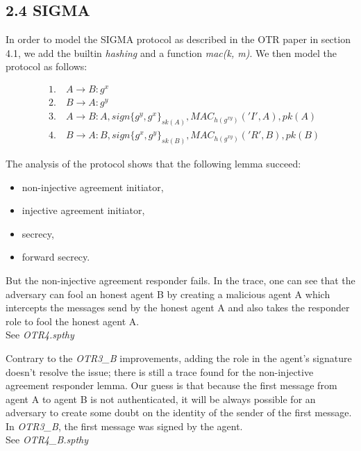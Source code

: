 \documentclass[
]{article}
\begin{document}
\newpage
\hypertarget{sigma}{%
\subsection{2.4 SIGMA}\label{sigma}}

In order to model the SIGMA protocol as described in the OTR paper in section 4.1, we add the builtin \emph{hashing} and a function \emph{mac(k, m)}. We then model the protocol as follows:

\begin{align*}
&\text{1.} \quad A \rightarrow B: g^x \\
&\text{2.} \quad B \rightarrow A: g^y \\
&\text{3.} \quad A \rightarrow B: A, sign\{g^y, g^x\}_{sk(A)}, MAC_{h(g^{xy})}('I', A), pk(A) \\
&\text{4.} \quad B \rightarrow A: B, sign\{g^x, g^y\}_{sk(B)}, MAC_{h(g^{xy})}('R', B), pk(B)
\end{align*}

The analysis of the protocol shows that the following lemma succeed:

\begin{itemize}
    \item non-injective agreement initiator,
    \item injective agreement initiator,
    \item secrecy,
    \item forward secrecy.
\end{itemize}

But the non-injective agreement responder fails. In the trace, one can see that the adversary can fool an honest agent B by creating a malicious agent A which intercepts the messages send by the honest agent A and also takes the responder role to fool the honest agent A.\\
See \emph{OTR4.spthy}

Contrary to the \emph{OTR3\_B} improvements, adding the role in the agent's signature doesn't resolve the issue; there is still a trace found for the non-injective agreement responder lemma. Our guess is that because the first message from agent A to agent B is not authenticated, it will be always possible for an adversary to create some doubt on the identity of the sender of the first message. In \emph{OTR3\_B}, the first message was signed by the agent.\\
See \emph{OTR4\_B.spthy}
\end{document}
